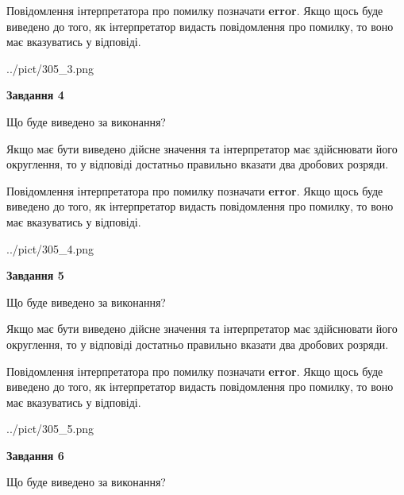 \documentclass[12pt, ukrainian]{article}
\begin{document}
{\begin {Large}
Повідомлення інтерпретатора про помилку позначати \textbf{error}.
Якщо щось буде виведено до того, як інтерпретатор видасть повідомлення про помилку, 
то воно має вказуватись у відповіді. \par

\begin{center}
	{../pict/305_3.png}
\end{center}
\newpage

{\begin {center}\textbf{Завдання 4}\end {center}}\par
Що буде виведено за виконання? \par

Якщо має бути виведено дійсне значення та інтерпретатор має здійснювати його округлення, 
то у відповіді достатньо правильно вказати два дробових розряди.

Повідомлення інтерпретатора про помилку позначати \textbf{error}.
Якщо щось буде виведено до того, як інтерпретатор видасть повідомлення про помилку, 
то воно має вказуватись у відповіді. \par

\begin{center}
	{../pict/305_4.png}
\end{center}
\newpage

{\begin {center}\textbf{Завдання 5}\end {center}}\par
Що буде виведено за виконання? \par

Якщо має бути виведено дійсне значення та інтерпретатор має здійснювати його округлення, 
то у відповіді достатньо правильно вказати два дробових розряди.

Повідомлення інтерпретатора про помилку позначати \textbf{error}.
Якщо щось буде виведено до того, як інтерпретатор видасть повідомлення про помилку, 
то воно має вказуватись у відповіді. \par

\begin{center}
	{../pict/305_5.png}
\end{center}
\newpage

{\begin {center}\textbf{Завдання 6}\end {center}}\par
Що буде виведено за виконання? \par


\end{Large}}
\end{document}
